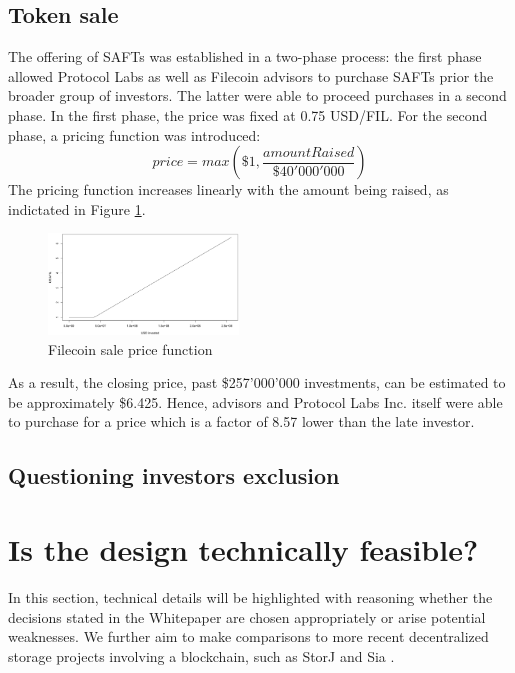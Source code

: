 \documentclass[conference]{IEEEtran}
\begin{document}
\subsection{Token sale}
\label{subsec:token-sale}
The offering of SAFTs was established in a two-phase process: the first phase allowed Protocol Labs as well as Filecoin advisors to purchase SAFTs prior the broader group of investors. 
The latter were able to proceed purchases in a second phase.
In the first phase, the price was fixed at 0.75 USD/FIL.
For the second phase, a pricing function was introduced:
\[ price = max(\$1, \frac{amountRaised}{\$40'000'000}) \]
The pricing function increases linearly with the amount being raised, as indictated in Figure \ref{fig:sale-price}.
\begin{figure}[h]
\centering
\includegraphics[width=0.45\textwidth]{filecoin-tokensale.png}
\caption{Filecoin sale price function}
\label{fig:sale-price}
\end{figure}
As a result, the closing price, past \$257'000'000 investments, can be estimated to be approximately \$6.425.
Hence, advisors and Protocol Labs Inc. itself were able to purchase for a price which is a factor of 8.57 lower than the late investor.

\subsection{Questioning investors exclusion}


\section{Is the design technically feasible?}
\label{sec:tech-feasibility}
In this section, technical details will be highlighted with reasoning whether the decisions stated in the Whitepaper\cite{filecoin} are chosen appropriately or arise potential weaknesses.
We further aim to make comparisons to more recent decentralized storage projects involving a blockchain, such as StorJ \cite{storj} and Sia \cite{sia}.
\end{document}
